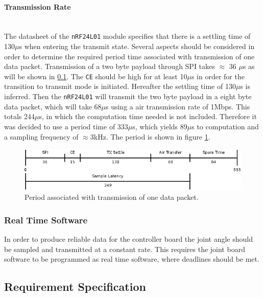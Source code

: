 \paragraph{Transmission Rate} %
\label{par:transmission_rate}~\\
The datasheet of the \texttt{nRF24L01} module specifies that there is a settling time of 130$\mu$s when entering the transmit state.
Several aspects should be considered in order to determine the required period time associated with transmission of one data packet. 
Transmission of a two byte payload through SPI takes $\approx$ 36 $\mu$s as will be shown in \ref{}.
The \texttt{CE} should be high for at least 10$\mu$s in order for the transition to transmit mode is initiated.
Hereafter the settling time of 130$\mu$s is inferred.
Then the \texttt{nRF24L01} will transmit the two byte payload in a eight byte data packet, which will take 68$\mu$s using a air transmission rate of 1Mbps.
This totals 244$\mu$s, in which the computation time needed is not included.
Therefore it was decided to use a period time of 333$\mu$s, which yields 89$\mu$s to computation and a sampling frequency of $\approx$3kHz.
The period is shown in figure \ref{fig:tiny_period}.

\begin{figure}[h]
	\centering
	\includegraphics[width=1\linewidth]{graphics/latency_diagram}
	\caption[Period of wireless transmission]{Period associated with transmission of one data packet.}
	\label{fig:tiny_period}
\end{figure}



\subsubsection{Real Time Software}
In order to produce reliable data for the controller board the joint angle should be sampled and transmitted at a constant rate.
This requires the joint board software to be programmed as real time software, where deadlines should be met.

\subsection{Requirement Specification} 

